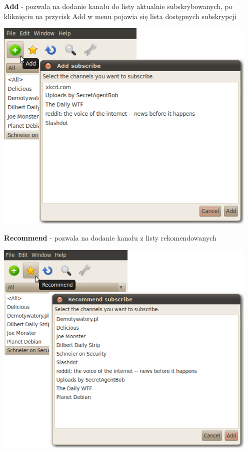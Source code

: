 \documentclass[a4paper,11pt]{report}
\begin{document}
\begin{itemize}

  \item[\textbf{Add}] - pozwala na dodanie kanału do listy aktualnie
  subskrybowanych, po kliknięciu na przycisk Add w menu pojawia się lista
  dostępnych subskrypcji
  \begin{center}
  \includegraphics[scale=0.5]{./img/menu_add.png}
  \end{center}


  \item[\textbf{Recommend}] - pozwala na dodanie kanału z listy rekomendowanych
  \begin{center}
  \includegraphics[scale=0.5]{./img/menu_recom.png}
  \end{center}



\end{itemize}
\end{document}
